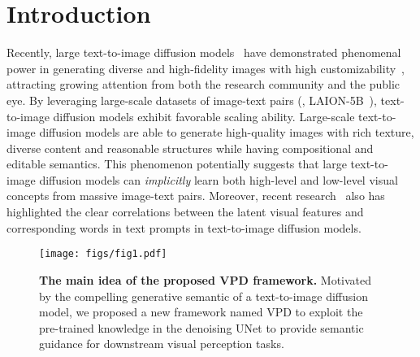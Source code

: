 \documentclass[10pt,twocolumn,letterpaper]{article}
\begin{document}
\section{Introduction}

Recently, large text-to-image diffusion models~\cite{rombach2022high,ramesh2022dalle2} have demonstrated phenomenal power in generating diverse and high-fidelity images with high customizability~\cite{rombach2022high,hertz2022prompt,parmar2023zero,brooks2022instructpix2pix}, attracting growing attention from both the research community and the public eye. By leveraging large-scale datasets of image-text pairs (\eg, LAION-5B~\cite{schuhmann2022laion}), text-to-image diffusion models exhibit favorable scaling ability. Large-scale text-to-image diffusion models are able to generate high-quality images with rich texture, diverse content and reasonable structures while having compositional and editable semantics. This phenomenon potentially suggests that large text-to-image diffusion models can \emph{implicitly} learn both high-level and low-level visual concepts from massive image-text pairs. Moreover, recent research~\cite{hertz2022prompt,parmar2023zero} also has highlighted the clear correlations between the latent visual features and corresponding words in text prompts in text-to-image diffusion models.

\begin{figure}[t]
    \centering
    \texttt{[image: figs/fig1.pdf]}
    \caption{\textbf{The main idea of the proposed VPD framework.} Motivated by the compelling generative semantic of a text-to-image diffusion model, we proposed a new framework named VPD to exploit the pre-trained knowledge in the denoising UNet to provide semantic guidance for downstream visual perception tasks.}
    \label{fig:idea}
    \vspace{-15pt}
\end{figure}
\end{document}
